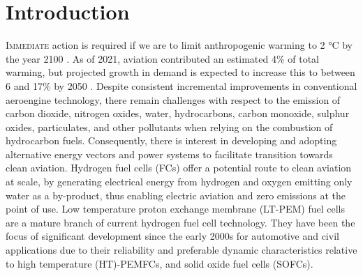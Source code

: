 \section{Introduction}

\lettrine{I}{mmediate} action is required if we are to limit anthropogenic warming to 2 °C by the year 2100 \cite{environmentEmissionsGapReport2024}.
As of 2021, aviation contributed an estimated 4\% of total warming, but projected growth in demand is expected to increase this to between 6 and 17\% by 2050 \cite{klowerQuantifyingAviationsContribution2021}.
Despite consistent incremental improvements in conventional aeroengine technology, there remain challenges with respect to the emission of carbon dioxide, nitrogen oxides, water, hydrocarbons, carbon monoxide, sulphur oxides, particulates, and other pollutants when relying on the combustion of hydrocarbon fuels.
Consequently, there is interest in developing and adopting alternative energy vectors and power systems to facilitate transition towards clean aviation.
Hydrogen fuel cells (FCs) offer a potential route to clean aviation at scale, by generating electrical energy from hydrogen and oxygen emitting only water as a by-product, thus enabling electric aviation and zero emissions at the point of use.
Low temperature proton exchange membrane (LT-PEM) fuel cells are a mature branch of current hydrogen fuel cell technology. They have been the focus of significant development since the early 2000s for automotive and civil applications due to their reliability and preferable dynamic characteristics relative to high temperature (HT)-PEMFCs, and solid oxide fuel cells (SOFCs).

